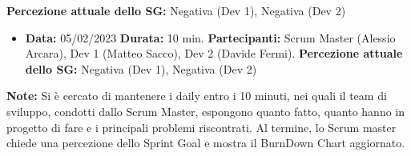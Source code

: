\documentclass[a4paper, oneside]{article}
\newcommand\quattro{Scrum Master (Alessio Arcara), Dev 1 (Matteo Sacco), Dev 2 (Davide Fermi).}
\begin{document}
\begin{landscape}
\begin{itemize}
            \newline \textbf{Percezione attuale dello SG:} Negativa (Dev 1), Negativa (Dev 2)
        \end{itemize}
        \begin{itemize}
            \item \textbf{Data:} 05/02/2023
            \newline \textbf{Durata:} 10 min.
            \newline \textbf{Partecipanti:}  \quattro
            \newline \textbf{Percezione attuale dello SG:} Negativa (Dev 1), Negativa (Dev 2)
        \end{itemize}
        \vspace{2mm} %
        \textbf{Note:} Si è cercato di mantenere i daily entro i 10 minuti, nei quali il team di sviluppo, condotti dallo Scrum Master, espongono quanto fatto, quanto hanno in progetto di fare e i principali problemi riscontrati. Al termine, lo Scrum master chiede una percezione dello Sprint Goal e mostra il BurnDown Chart aggiornato.

        \newpage

\end{landscape}
\end{document}
